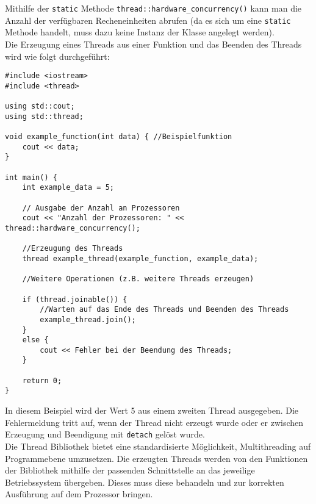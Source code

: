 Mithilfe der \texttt{static} Methode \texttt{thread::hardware\_concurrency()} kann man die Anzahl der verfügbaren Recheneinheiten abrufen (da es sich um eine \texttt{static} Methode handelt, muss dazu keine Instanz der Klasse angelegt werden).\\
Die Erzeugung eines Threads aus einer Funktion und das Beenden des Threads wird wie folgt durchgeführt:
\begin{lstlisting}
#include <iostream>
#include <thread>

using std::cout;
using std::thread;

void example_function(int data) { //Beispielfunktion
	cout << data;
}

int main() {
	int example_data = 5;
	
	// Ausgabe der Anzahl an Prozessoren
	cout << "Anzahl der Prozessoren: " << thread::hardware_concurrency();	
	
	//Erzeugung des Threads
	thread example_thread(example_function, example_data); 

	//Weitere Operationen (z.B. weitere Threads erzeugen)

	if (thread.joinable()) {
		//Warten auf das Ende des Threads und Beenden des Threads
		example_thread.join(); 
	}
	else {
		cout << Fehler bei der Beendung des Threads;
	}

	return 0;
}
\end{lstlisting}
In diesem Beispiel wird der Wert 5 aus einem zweiten Thread ausgegeben. Die Fehlermeldung tritt auf, wenn der Thread nicht erzeugt wurde oder er zwischen Erzeugung und Beendigung mit \texttt{detach} gelöst wurde.\\[0.25cm]
Die Thread Bibliothek bietet eine standardisierte Möglichkeit, Multithreading auf Programmebene umzusetzen. Die erzeugten Threads werden von den Funktionen der Bibliothek mithilfe der passenden Schnittstelle an das jeweilige Betriebssystem übergeben. Dieses muss diese behandeln und zur korrekten Ausführung auf dem Prozessor bringen.

